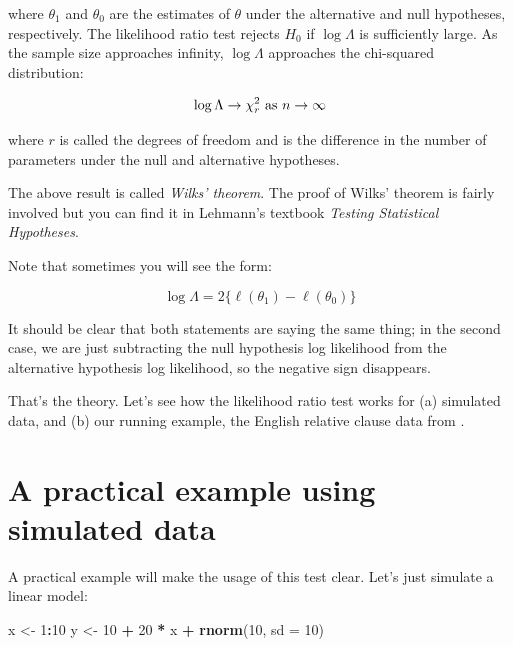 \documentclass[12pt,]{krantz}
\newenvironment{Shaded}{\begin{snugshade}}{\end{snugshade}}
\newcommand{\DataTypeTok}[1]{\textcolor[rgb]{0.13,0.29,0.53}{#1}}
\newcommand{\DecValTok}[1]{\textcolor[rgb]{0.00,0.00,0.81}{#1}}
\newcommand{\KeywordTok}[1]{\textcolor[rgb]{0.13,0.29,0.53}{\textbf{#1}}}
\newcommand{\NormalTok}[1]{#1}
\newcommand{\OperatorTok}[1]{\textcolor[rgb]{0.81,0.36,0.00}{\textbf{#1}}}
\newcommand{\StringTok}[1]{\textcolor[rgb]{0.31,0.60,0.02}{#1}}
\begin{document}
where \(\theta_1\) and \(\theta_0\) are the estimates of \(\theta\) under the alternative and null hypotheses, respectively. The likelihood ratio test rejects \(H_0\) if \(\log \Lambda\) is sufficiently large. As the sample size approaches infinity, \(\log \Lambda\) approaches the chi-squared distribution:

\begin{equation}
\log \Lambda \rightarrow \chi_r^2  \hbox{ as }  n \rightarrow \infty
\end{equation}

where \(r\) is called the degrees of freedom and is the difference in the number of parameters under the null and alternative hypotheses.

The above result is called \emph{Wilks' theorem}. The proof of Wilks' theorem is fairly involved but you can find it in Lehmann's textbook \emph{Testing Statistical Hypotheses}.

Note that sometimes you will see the form:

\begin{equation}
 \log \Lambda = 2 \{\ell(\theta_1) - \ell(\theta_0)\}
\end{equation}

It should be clear that both statements are saying the same thing; in the second case, we are just subtracting the null hypothesis log likelihood from the alternative hypothesis log likelihood, so the negative sign disappears.

That's the theory. Let's see how the likelihood ratio test works for (a) simulated data, and (b) our running example, the English relative clause data from \citet{grodner}.

\hypertarget{a-practical-example-using-simulated-data}{%
\section{A practical example using simulated data}\label{a-practical-example-using-simulated-data}}

A practical example will make the usage of this test clear.
Let's just simulate a linear model:

\begin{Shaded}
\begin{Highlighting}[]
\NormalTok{x <-}\StringTok{ }\DecValTok{1}\OperatorTok{:}\DecValTok{10}
\NormalTok{y <-}\StringTok{ }\DecValTok{10} \OperatorTok{+}\StringTok{ }\DecValTok{20} \OperatorTok{*}\StringTok{ }\NormalTok{x }\OperatorTok{+}\StringTok{ }\KeywordTok{rnorm}\NormalTok{(}\DecValTok{10}\NormalTok{, }\DataTypeTok{sd =} \DecValTok{10}\NormalTok{)}
\end{Highlighting}
\end{Shaded}
\end{document}
